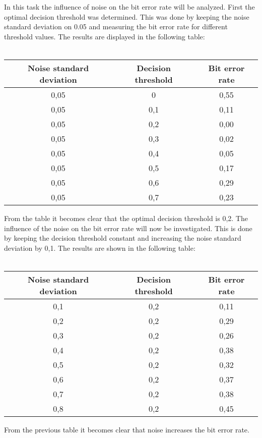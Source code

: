 \documentclass[11pt,titlepage]{report}
\begin{document}
In this task the influence of noise on the bit error rate will be analyzed. First the optimal decision threshold was determined. This was done by keeping the noise standard deviation on 0.05 and measuring the bit error rate for different threshold values. The results are displayed in the following table: \\ \\ 

\begin{center}
\label{table:optimalthreshold}
    \begin{tabular}{  c | c | c  }
    
    Noise standard deviation & Decision threshold & Bit error rate  \\ \hline
    0,05 & 0 & 0,55 \\ \hline
    0,05 & 0,1 & 0,11 \\ \hline
    0,05 & 0,2 & 0,00 \\ \hline
    0,05 & 0,3 & 0,02 \\ \hline
    0,05 & 0,4 & 0,05 \\ \hline
    0,05 & 0,5 & 0,17 \\ \hline
    0,05 & 0,6 & 0,29 \\ \hline
    0,05 & 0,7 & 0,23 \\ 
    \end{tabular}
\end{center}



From the table it becomes clear that the optimal decision threshold is 0,2. The influence of the noise on the bit error rate will now be investigated. This is done by keeping the decision threshold constant and increasing the noise standard deviation by 0,1. The results are shown in the following table: \\ \\
\begin{center}
\label{table:influenceofnoise}
    \begin{tabular}{  c | c | c  }
    
    Noise standard deviation & Decision threshold & Bit error rate  \\ \hline
    0,1 & 0,2 & 0,11 \\ \hline
    0,2 & 0,2 & 0,29 \\ \hline
    0,3 & 0,2 & 0,26 \\ \hline
    0,4 & 0,2 & 0,38 \\ \hline
    0,5 & 0,2 & 0,32 \\ \hline
    0,6 & 0,2 & 0,37 \\ \hline
    0,7 & 0,2 & 0,38 \\ \hline
    0,8 & 0,2 & 0,45 \\ 
    \end{tabular}
\end{center}


From the previous table it becomes clear that noise increases the bit error rate. 
\end{document}
